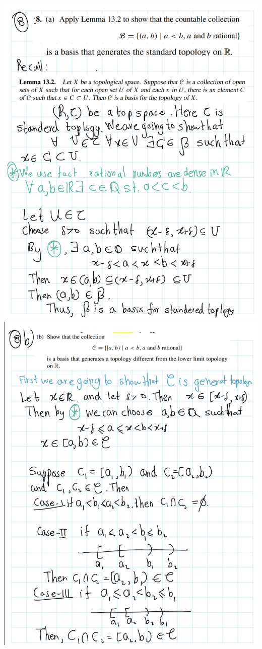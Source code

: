 \documentclass[
]{book}
\theoremstyle{definition}
\theoremstyle{definition}
\theoremstyle{definition}
\theoremstyle{definition}
\theoremstyle{remark}
\begin{document}
\includegraphics{figures/Exercises/Ex 2.13/ex-8-1.png}
\includegraphics{figures/Exercises/Ex 2.13/ex-8-2.png}
\end{document}
